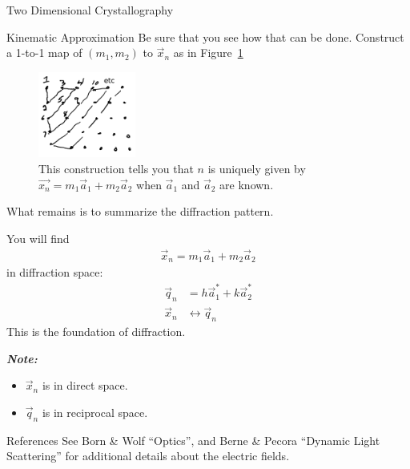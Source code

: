 \documentclass{article}
\newcommand{\note}[1]{\vspace{3\parsep}\textit{\textbf{Note: }}#1\vspace{2\parsep}}
\begin{document}
\begin{section}{Two Dimensional Crystallography}
\begin{subsection}{Kinematic Approximation}
Be sure that you see how that can be done. Construct a 1-to-1 map of $(m_1,m_2)$ to $\vec{x}_n$ as in Figure~\ref{fig:map}

\begin{figure}[h]
	\centering
	\includegraphics[height=80pt]{map}
	\caption{This construction tells you that $n$ is uniquely given by $\vec{x_n} = m_1 \vec{a}_1 + m_2\vec{a}_2$ when $\vec{a}_1$ and $\vec{a}_2$ are known.}
	\label{fig:map}
\end{figure}

What remains is to summarize the diffraction pattern.

You will find \begin{align*}\vec{x}_n = m_1\vec{a}_1 + m_2\vec{a}_2\end{align*} in diffraction space:
\begin{align*}
	\vec{q}_n &= h \vec{a}_1^\ast + k\vec{a}_2^\ast\\
	\vec{x}_n &\leftrightarrow \vec{q}_n
\end{align*}
This is the foundation of diffraction.

\note{
	\begin{itemize}
		\item	$\vec{x}_n$ is in direct space.
		\item $\vec{q}_n$ is in reciprocal space.
	\end{itemize}}\end{subsection}\end{section}
\begin{section}{References}
See Born \& Wolf ``Optics'', and Berne \& Pecora ``Dynamic Light Scattering'' for additional details about the electric fields.
\end{section}
\end{document}
